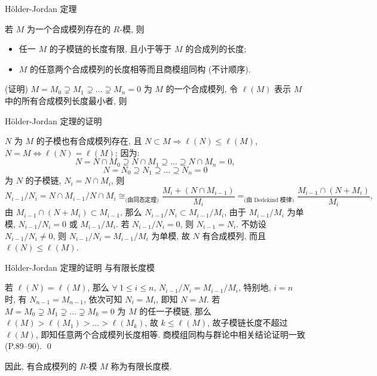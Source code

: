 
\begin{frame}{Hölder-Jordan 定理}

\begin{thm}
若 $M$ 为一个合成模列存在的 $R$-模, 则
\begin{itemize}
\item[(i)] 任一 $M$ 的子模链的长度有限, 且小于等于 $M$ 的合成列的长度;
\item[(ii)] $M$ 的任意两个合成模列的长度相等而且商模组同构 (不计顺序).
\end{itemize}
\end{thm}

\startproof[bg=yellow, fg=red](证明)
$M = M_0 \supsetneq M_1 \supsetneq \dots \supsetneq M_n = 0$ 为 $M$
的一个合成模列, 令 $\ell(M)$ 表示 $M$ 中的所有合成模列长度最小者, 则

\end{frame}


\begin{frame}{Hölder-Jordan 定理的证明 \texorpdfstring{}{1}}

 $N$ 为 $M$ 的子模也有合成模列存在, 且 $N \subset M
\Longrightarrow \ell(N) \leqslant \ell(M)$, $N = M \iff \ell(N) = \ell(M)$;
因为:
\[
N = N \cap M_0 \supseteq N \cap M_1 \supseteq \dots \supseteq N \cap M_n = 0,
\]
\[
N = N_0 \supseteq N_1 \supseteq \dots \supseteq N_n = 0
\]
为 $N$ 的子模链, $N_i = N \cap M_i$, 则
\[
N_{i-1}/N_i
= N \cap M_{i-1} \big/ N \cap M_i
\cong_{\text{(由同态定理)}} \frac{M_i + (N \cap M_{i-1})}{M_i}
=_{\text{(由 Dedekind 模律)}} \frac{M_{i-1} \cap (N + M_i)}{M_i},
\]
\pause
由 $M_{i-1} \cap (N + M_i) \subset M_{i-1}$,
那么 $N_{i-1}/N_i \subset M_{i-1}/M_i$, 由于 $M_{i-1}/M_i$ 为单模,
$N_{i-1}/N_i = 0$ 或 $M_{i-1}/M_i$. 若 $N_{i-1}/N_i = 0$, 则 $N_{i-1} = N_i$.
不妨设 $N_{i-1}/N_i \neq 0$, 则 $N_{i-1}/N_i = M_{i-1}/M_i$ 为单模,
故 $N$ 有合成模列, 而且 $\ell(N) \leqslant \ell(M)$.

\end{frame}


\begin{frame}{Hölder-Jordan 定理的证明 \texorpdfstring{}{2} 与有限长度模}

若 $\ell(N) = \ell(M)$, 那么 $\forall\ 1 \leqslant i \leqslant n$,
$N_{i-1}/N_i = M_{i-1}/M_i$,
特别地, $i = n$ 时, 有 $N_{n-1} = M_{n-1}$, 依次可知 $N_i = M_i$,
即知 $N = M$.
 若 $M = M_0 \supsetneq M_1 \supsetneq \dots \supsetneq M_k = 0$ 为 $M$
的任一子模链,
那么 $\ell(M) > \ell(M_1) > \dots > \ell(M_k)$, 故 $k \leqslant \ell(M)$,
故子模链长度不超过 $\ell(M)$, 即知任意两个合成模列长度相等.
商模组同构与群论中相关结论证明一致 (P.89--90).
\qed

\pause

\begin{Def}[有限长度模]
因此, 有合成模列的 $R$-模 $M$ 称为有限长度模.
\end{Def}

\end{frame}

